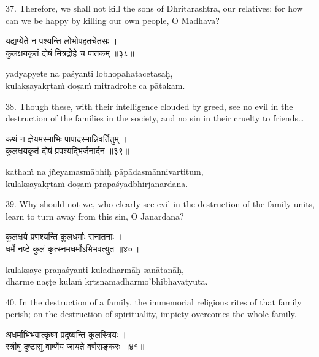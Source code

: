 37. Therefore, we shall not kill the sons of Dhritarashtra, our relatives; for
how can we be happy by killing our own people, O Madhava?

\begin{gitaverse}
यद्यप्येते न पश्यन्ति लोभोपहतचेतसः । \\
कुलक्षयकृतं दोषं मित्रद्रोहे च पातकम् ॥३८॥
\end{gitaverse}

\begin{transliteration}
yadyapyete na paśyanti lobhopahatacetasaḥ, \\
kulakṣayakṛtaṁ doṣaṁ mitradrohe ca pātakam.
\end{transliteration}

38. Though these, with their intelligence clouded by greed, see no evil in the
destruction of the families in the society, and no sin in their cruelty to
friends\ldots

\begin{gitaverse}
कथं न ज्ञेयमस्माभिः पापादस्मान्निवर्तितुम् । \\
कुलक्षयकृतं दोषं प्रपश्यद्भिर्जनार्दन ॥३९॥
\end{gitaverse}

\begin{transliteration}
kathaṁ na jñeyamasmābhiḥ pāpādasmānnivartitum, \\
kulakṣayakṛtaṁ doṣaṁ prapaśyadbhirjanārdana.
\end{transliteration}

39. Why should not we, who clearly see evil in the destruction of the
family-units, learn to turn away from this sin, O Janardana?

\begin{gitaverse}
कुलक्षये प्रणश्यन्ति कुलधर्माः सनातनाः । \\
धर्मे नष्टे कुलं कृत्स्नमधर्मोऽभिभवत्युत ॥४०॥
\end{gitaverse}

\begin{transliteration}
kulakṣaye praṇaśyanti kuladharmāḥ sanātanāḥ, \\
dharme naṣṭe kulaṁ kṛtsnamadharmo'bhibhavatyuta.
\end{transliteration}

40. In the destruction of a family, the immemorial religious rites of that
family perish; on the destruction of spirituality, impiety overcomes the whole
family.

\begin{gitaverse}
अधर्माभिभवात्कृष्ण प्रदुष्यन्ति कुलस्त्रियः । \\
स्त्रीषु दुष्टासु वार्ष्णेय जायते वर्णसङ्करः ॥४१॥
\end{gitaverse}

